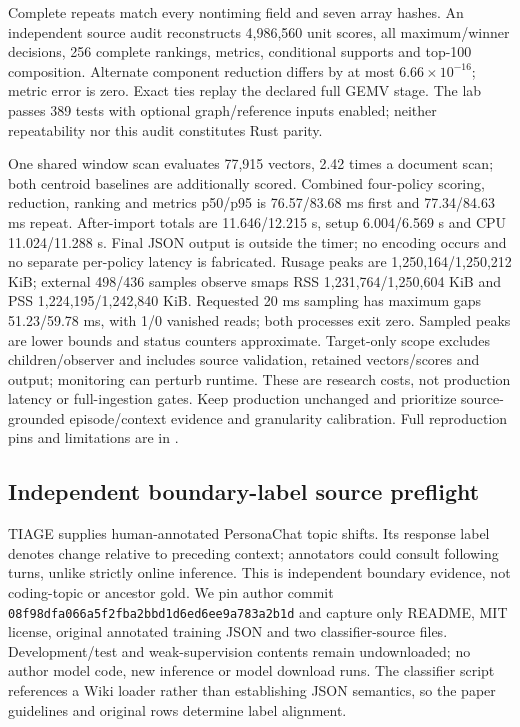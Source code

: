 \documentclass[11pt]{article}
\begin{document}
Complete repeats match every nontiming field and seven array hashes. An independent
source audit reconstructs 4,986,560 unit scores, all maximum/winner decisions,
256 complete rankings, metrics, conditional supports and top-100 composition.
Alternate component reduction differs by at most $6.66\times10^{-16}$;
metric error is zero. Exact ties replay the declared full GEMV stage.
The lab passes 389 tests with optional graph/reference inputs enabled; neither
repeatability nor this audit constitutes Rust parity.

One shared window scan evaluates 77,915 vectors, 2.42 times a document scan;
both centroid baselines are additionally scored. Combined four-policy scoring,
reduction, ranking and metrics p50/p95 is 76.57/83.68 ms first and
77.34/84.63 ms repeat. After-import totals are 11.646/12.215 s, setup
6.004/6.569 s and CPU 11.024/11.288 s. Final JSON output is outside the timer;
no encoding occurs and no separate per-policy latency is fabricated.
Rusage peaks are 1,250,164/1,250,212 KiB; external 498/436 samples observe
smaps RSS 1,231,764/1,250,604 KiB and PSS 1,224,195/1,242,840 KiB.
Requested 20 ms sampling has maximum gaps 51.23/59.78 ms, with 1/0 vanished
reads; both processes exit zero. Sampled peaks are lower bounds and status
counters approximate. Target-only scope excludes children/observer and includes
source validation, retained vectors/scores and output; monitoring can perturb
runtime. These are research costs, not production latency or full-ingestion gates.
Keep production unchanged and prioritize source-grounded episode/context evidence
and granularity calibration. Full reproduction pins and limitations are in
.

\subsection{Independent boundary-label source preflight}
TIAGE \cite{xie2021tiage} supplies human-annotated PersonaChat topic shifts.
Its response label denotes change relative to preceding context; annotators
could consult following turns, unlike strictly online inference. This is
independent boundary evidence, not coding-topic or ancestor gold.
We pin author commit \texttt{08f98dfa066a5f2fba2bbd1d6ed6ee9a783a2b1d} and
capture only README, MIT license, original annotated training JSON and two
classifier-source files. Development/test and weak-supervision contents remain
undownloaded; no author model code, new inference or model download runs.
The classifier script references a Wiki loader rather than establishing JSON
semantics, so the paper guidelines and original rows determine label alignment.
\end{document}
